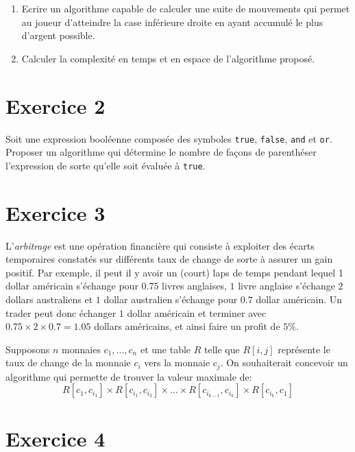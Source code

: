 \documentclass[a4paper,10pt]{article}
\begin{document}
\begin{enumerate}
\item Ecrire un algorithme capable de calculer une suite de mouvements qui
permet au joueur d'atteindre la case inférieure droite en ayant accumulé le
plus d'argent possible.
\item Calculer la complexité en temps et en espace de l'algorithme proposé.
\end{enumerate}

\section*{Exercice 2}


Soit une expression booléenne composée des symboles \texttt{true},
\texttt{false}, \texttt{and} et \texttt{or}. Proposer un algorithme qui
détermine le nombre de façons de parenthéser l'expression de sorte qu'elle soit
évaluée à \texttt{true}.

\section*{Exercice 3}


L'\textit{arbitrage} est une opération financière qui consiste à exploiter des
écarts temporaires constatés sur différents taux de change de sorte à assurer un
gain positif. Par exemple, il peut il y avoir un (court) laps de temps pendant
lequel 1 dollar américain s'échange pour $0.75$ livres anglaises, $1$ livre
anglaise s'échange $2$ dollars australiens et $1$ dollar australien s'échange
pour $0.7$ dollar américain. Un trader peut donc échanger $1$ dollar
américain et terminer avec $0.75 \times 2 \times 0.7=1.05$ dollars américains,
et ainsi faire un profit de $5\%$.

Supposons $n$ monnaies $c_1, ..., c_n$ et une table $R$ telle que $R[i,j]$
représente le taux de change de la monnaie $c_i$ vers la monnaie $c_j$.  On
souhaiterait concevoir un algorithme qui permette de trouver la valeur maximale
de: $$R[c_1, c_{i_1}] \times R[c_{i_1}, c_{i_2}] \times ... \times
R[c_{i_{k-1}}, c_{i_k}] \times R[c_{i_k}, c_{1}]   $$


\section*{Exercice 4}
\end{document}
